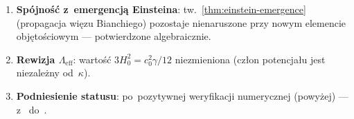 \begin{remark}\label{rem:next-steps-kappa}
\begin{enumerate}[nosep]
  \item \textbf{Sp\'ojno\'s\'c z~emergencj\k{a} Einsteina}:
    tw.~\ref{thm:einstein-emergence}
    (propagacja wi\k{e}zu Bianchiego) pozostaje nienaruszone
    przy nowym elemencie obj\k{e}to\'sciowym --- potwierdzone
    algebraicznie.
  \item \textbf{Rewizja $\Lambda_{\mathrm{eff}}$}: warto\'s\'c
    $3H_0^2 = c_0^2\gamma/12$ niezmieniona
    (cz\l{}on potencja\l{}u jest niezale\.zny od~$\kappa$).
  \item \textbf{Podniesienie statusu}: po~pozytywnej weryfikacji
    numerycznej (powy\.zej) --- z~
    do~.
\end{enumerate}
\end{remark}
